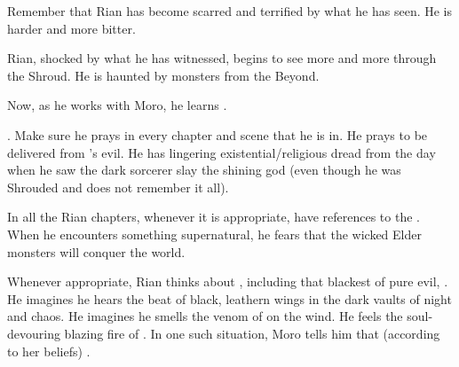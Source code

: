 
Remember that Rian has become scarred and terrified by what he has seen. 
He is harder and more bitter. 

Rian, shocked by what he has witnessed, begins to see more and more through the Shroud. 
He is haunted by monsters from the Beyond. 


Now, as he works with Moro, he learns . 
    
.
Make sure he prays in every chapter and scene that he is in.
He prays to be delivered from \Isphet's evil. 
He has lingering existential/religious dread from the day when he saw the dark sorcerer slay the shining god (even though he was Shrouded and does not remember it all). 

In all the Rian chapters, whenever it is appropriate, have references to the . 
When he encounters something supernatural, he fears that the wicked Elder monsters will conquer the world. 

Whenever appropriate, Rian thinks about \dragons, including that blackest \dragon of pure evil, \Isphet.
He imagines he hears the beat of black, leathern wings in the dark vaults of night and chaos. 
He imagines he smells the venom of \dragons on the wind. 
He feels the soul-devouring blazing fire of \dragons. 
In one such situation, Moro tells him that (according to her beliefs) . 





